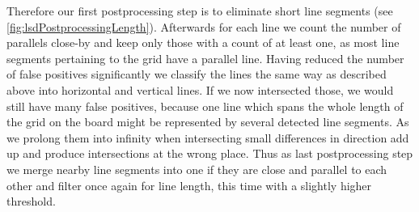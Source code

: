 	Therefore our first postprocessing step is to eliminate short line segments (see \ref{fig:lsdPostprocessingLength}). Afterwards for each line we count the number of parallels close-by and keep only those with a count of at least one, as most line segments pertaining to the grid have a parallel line. Having reduced the number of false positives significantly we classify the lines the same way as described above into horizontal and vertical lines. If we now intersected those, we would still have many false positives, because one line which spans the whole length of the grid on the board might be represented by several detected line segments. As we prolong them into infinity when intersecting small differences in direction add up and produce intersections at the wrong place. Thus as last postprocessing step we merge nearby line segments into one if they are close and parallel to each other and filter once again for line length, this time with a slightly higher threshold.

